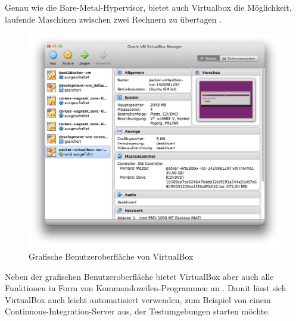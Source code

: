 Genau wie die Bare-Metal-Hypervisor, bietet auch Virtualbox die Möglichkeit, laufende Maschinen zwischen zwei Rechnern zu übertagen \citep[Vgl.][S. 111]{Oracle14}.

\begin{figure}[!ht]
  \begin{center}
    \includegraphics[width=14cm]{bilder/virtualbox-gui.png}
    \caption{Grafische Benutzeroberfläche von VirtualBox}
  \end{center}
\end{figure}

Neben der grafischen Benutzeroberfläche bietet VirtualBox aber auch alle Funktionen in Form von Kommandozeilen-Programmen an \citep[Vgl.][S. 113]{Oracle14}. Damit lässt sich VirtualBox auch leicht automatisiert verwenden, zum Beispiel von einem Continuous-Integration-Server aus, der Testumgebungen starten möchte.


